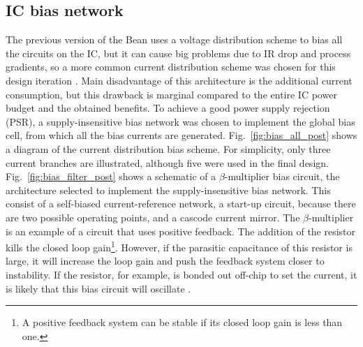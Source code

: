 \subsection{IC bias network}
The previous version of the Bean uses a voltage distribution scheme to bias all the circuits on the IC, but it can cause big problems due to IR drop and process gradients, so a more common current distribution scheme was chosen for this design iteration \citep{murmann101}.  Main disadvantage of this architecture is the additional current consumption, but this drawback is marginal compared to the entire IC power budget and the obtained benefits. To achieve a good power supply rejection (PSR), a supply-insensitive bias network was chosen to implement the global bias cell, from which all the bias currents are generated. Fig.~\ref{fig:bias_all_post} shows a diagram of the current distribution bias scheme. For simplicity, only three current branches are illustrated, although five were used in the final design. Fig.~\ref{fig:bias_filter_post} shows a schematic of a $\beta$-multiplier bias circuit, the architecture selected to implement the supply-insensitive bias network. This consist of a \mbox{self-biased} \mbox{current-reference} network, a \mbox{start-up} circuit, because there are two possible operating points, and a cascode current mirror. The $\beta$-multiplier is an example of a circuit that uses positive feedback. The addition of the resistor kills the closed loop gain\footnote{A positive feedback system can be stable if its closed loop gain is less than one.}. However, if the parasitic capacitance of this resistor is large, it will increase the loop gain and push the feedback system closer to instability. If the resistor, for example, is bonded out off-chip to set the current, it is likely that this bias circuit will oscillate \citep{baker101}.


